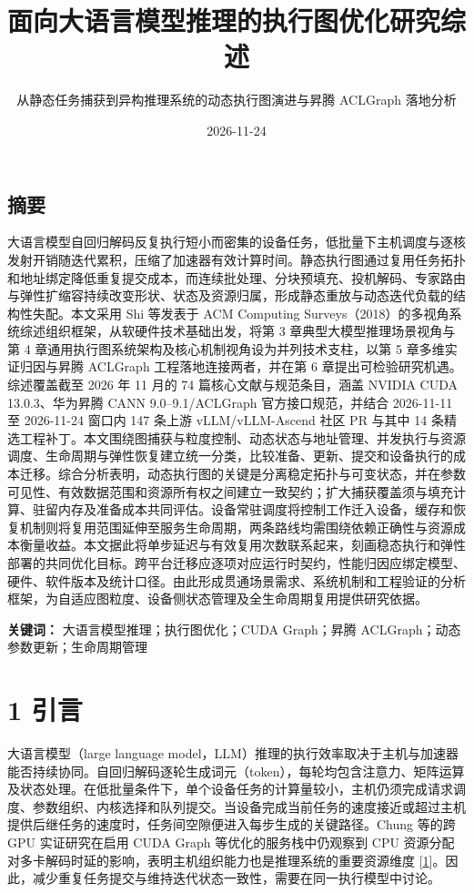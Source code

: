 \documentclass[UTF8,10.5pt,fontset=windows]{ctexart}
\title{面向大语言模型推理的执行图优化研究综述}
\subtitle{从静态任务捕获到异构推理系统的动态执行图演进与昇腾 ACLGraph
落地分析}
\author{}
\date{2026-11-24}
\begin{document}
\maketitle

\hypertarget{ux6458ux8981}{%
\subsection*{摘要}\label{ux6458ux8981}}

大语言模型自回归解码反复执行短小而密集的设备任务，低批量下主机调度与逐核发射开销随迭代累积，压缩了加速器有效计算时间。静态执行图通过复用任务拓扑和地址绑定降低重复提交成本，而连续批处理、分块预填充、投机解码、专家路由与弹性扩缩容持续改变形状、状态及资源归属，形成静态重放与动态迭代负载的结构性失配。本文采用
Shi 等发表于 ACM Computing
Surveys（2018）的多视角系统综述组织框架，从软硬件技术基础出发，将第 3
章典型大模型推理场景视角与第 4
章通用执行图系统架构及核心机制视角设为并列技术支柱，以第 5
章多维实证归因与昇腾 ACLGraph 工程落地连接两者，并在第 6
章提出可检验研究机遇。综述覆盖截至 2026 年 11 月的 74
篇核心文献与规范条目，涵盖 NVIDIA CUDA 13.0.3、华为昇腾 CANN
9.0--9.1/ACLGraph 官方接口规范，并结合 2026-11-11 至 2026-11-24 窗口内
147 条上游 vLLM/vLLM-Ascend 社区 PR 与其中 14
条精选工程补丁。本文围绕图捕获与粒度控制、动态状态与地址管理、并发执行与资源调度、生命周期与弹性恢复建立统一分类，比较准备、更新、提交和设备执行的成本迁移。综合分析表明，动态执行图的关键是分离稳定拓扑与可变状态，并在参数可见性、有效数据范围和资源所有权之间建立一致契约；扩大捕获覆盖须与填充计算、驻留内存及准备成本共同评估。设备常驻调度将控制工作迁入设备，缓存和恢复机制则将复用范围延伸至服务生命周期，两条路线均需围绕依赖正确性与资源成本衡量收益。本文据此将单步延迟与有效复用次数联系起来，刻画稳态执行和弹性部署的共同优化目标。跨平台迁移应逐项对应运行时契约，性能归因应绑定模型、硬件、软件版本及统计口径。由此形成贯通场景需求、系统机制和工程验证的分析框架，为自适应图粒度、设备侧状态管理及全生命周期复用提供研究依据。

\textbf{关键词：} 大语言模型推理；执行图优化；CUDA Graph；昇腾
ACLGraph；动态参数更新；生命周期管理

\hypertarget{section-1}{%
\section{1 引言}\label{section-1}}

大语言模型（large language
model，LLM）推理的执行效率取决于主机与加速器能否持续协同。自回归解码逐轮生成词元（token），每轮均包含注意力、矩阵运算及状态处理。在低批量条件下，单个设备任务的计算量较小，主机仍须完成请求调度、参数组织、内核选择和队列提交。当设备完成当前任务的速度接近或超过主机提供后继任务的速度时，任务间空隙便进入每步生成的关键路径。Chung
等的跨 GPU 实证研究在启用 CUDA Graph 等优化的服务栈中仍观察到 CPU
资源分配对多卡解码时延的影响，表明主机组织能力也是推理系统的重要资源维度
{[}\protect\hyperlink{ref-chung2026cpu}{1}{]}。因此，减少重复任务提交与维持迭代状态一致性，需要在同一执行模型中讨论。
\end{document}
